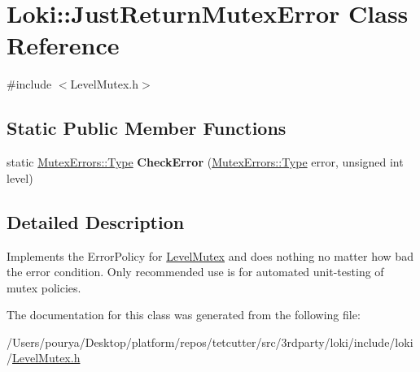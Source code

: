 \hypertarget{classLoki_1_1JustReturnMutexError}{}\section{Loki\+:\+:Just\+Return\+Mutex\+Error Class Reference}
\label{classLoki_1_1JustReturnMutexError}


{\ttfamily \#include $<$Level\+Mutex.\+h$>$}

\subsection*{Static Public Member Functions}
\begin{DoxyCompactItemize}
\item 
\hypertarget{classLoki_1_1JustReturnMutexError_a62b50ae7000e969faef1755eb2857ab8}{}static \hyperlink{classLoki_1_1MutexErrors_acd0eb6065ca303083d2e0229d7bff590}{Mutex\+Errors\+::\+Type} {\bfseries Check\+Error} (\hyperlink{classLoki_1_1MutexErrors_acd0eb6065ca303083d2e0229d7bff590}{Mutex\+Errors\+::\+Type} error, unsigned int level)\label{classLoki_1_1JustReturnMutexError_a62b50ae7000e969faef1755eb2857ab8}

\end{DoxyCompactItemize}


\subsection{Detailed Description}
Implements the Error\+Policy for \hyperlink{classLoki_1_1LevelMutex}{Level\+Mutex} and does nothing no matter how bad the error condition. Only recommended use is for automated unit-\/testing of mutex policies. 

The documentation for this class was generated from the following file\+:\begin{DoxyCompactItemize}
\item 
/\+Users/pourya/\+Desktop/platform/repos/tetcutter/src/3rdparty/loki/include/loki/\hyperlink{LevelMutex_8h}{Level\+Mutex.\+h}\end{DoxyCompactItemize}
